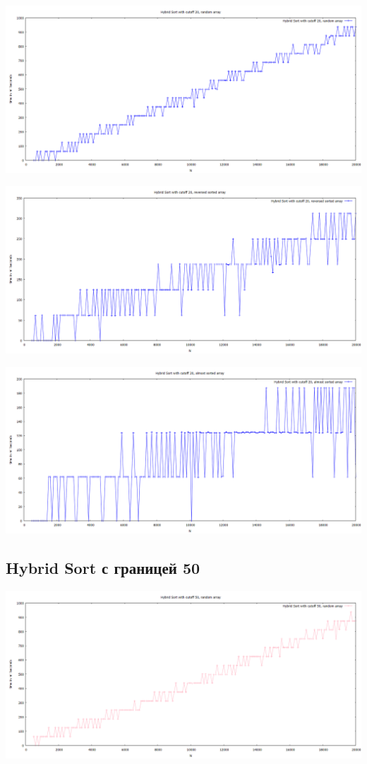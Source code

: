 \documentclass[11pt,a4paper]{article}
\begin{document}
\hspace*{-2cm} \includegraphics[scale=0.5]{hybrid_sort_20_random_data.PNG}

\hspace*{-2cm} \includegraphics[scale=0.5]{hybrid_sort_20_reversed_sorted_data.PNG}

\hspace*{-2cm} \includegraphics[scale=0.5]{hybrid_sort_20_almost_sorted_data.PNG}

\subsection*{Hybrid Sort с границей 50}

\hspace*{-2cm} \includegraphics[scale=0.5]{hybrid_sort_50_random_data.PNG}
\end{document}
